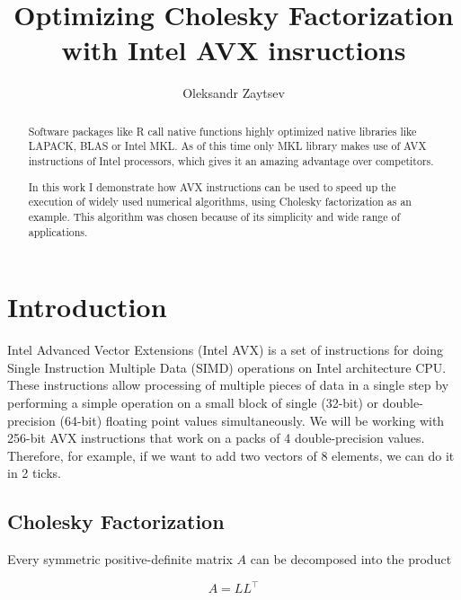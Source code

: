 \documentclass[sigplan]{acmart}
\begin{document}
\title{Optimizing Cholesky Factorization \\with Intel AVX insructions}

\author{Oleksandr Zaytsev}

\begin{abstract}
Software packages like R call native functions highly optimized native libraries like LAPACK, BLAS or Intel MKL. As of this time only MKL library makes use of AVX instructions of Intel processors, which gives it an amazing advantage over  competitors.

In this work I demonstrate how AVX instructions can be used to speed up the execution of widely used numerical algorithms, using Cholesky factorization as an example. This algorithm was chosen because of its simplicity and wide range of applications.
\end{abstract}


\maketitle

\section{Introduction}
Intel Advanced Vector Extensions (Intel AVX) is a set of instructions for doing Single Instruction Multiple Data (SIMD) operations on Intel architecture CPU\cite{Lomont}. These instructions allow processing of multiple pieces of data in a single step by performing a simple operation on a small block of single (32-bit) or double-precision (64-bit) floating point values simultaneously. We will be working with 256-bit AVX instructions that work on a packs of 4 double-precision values. Therefore, for example, if we want to add two vectors of 8 elements, we can do it in 2 ticks.

\subsection{Cholesky Factorization}
Every symmetric positive-definite matrix $A$ can be decomposed into the product

\[ A = LL^\top \]
\end{document}
